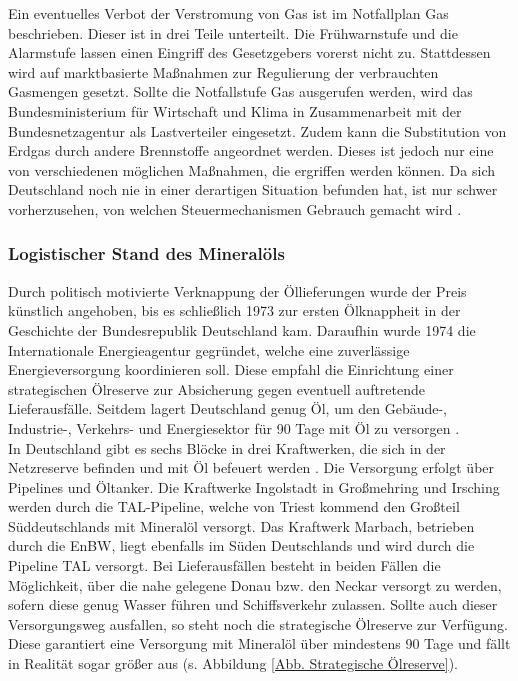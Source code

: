 			Ein eventuelles Verbot der Verstromung von Gas ist im Notfallplan Gas beschrieben.
			Dieser ist in drei Teile unterteilt. 
			Die Frühwarnstufe und die Alarmstufe lassen einen Eingriff des Gesetzgebers vorerst nicht zu. 
			Stattdessen wird auf marktbasierte Maßnahmen zur Regulierung der verbrauchten Gasmengen gesetzt. 			
			Sollte die Notfallstufe Gas ausgerufen werden, wird das Bundesministerium für Wirtschaft und Klima in Zusammenarbeit mit der Bundesnetzagentur als Lastverteiler eingesetzt.
			Zudem kann die Substitution von Erdgas durch andere Brennstoffe angeordnet werden.
			Dieses ist jedoch nur eine von verschiedenen möglichen Maßnahmen, die ergriffen werden können. 
			Da sich Deutschland noch nie in einer derartigen Situation befunden hat, ist nur schwer vorherzusehen, von welchen Steuermechanismen Gebrauch gemacht wird \cite{Notfallplan_Gas}.
	
		\subsubsection{Logistischer Stand des Mineralöls}
		
			Durch politisch motivierte Verknappung der Öllieferungen wurde der Preis künstlich angehoben, bis es schließlich 1973 zur ersten Ölknappheit in der Geschichte der Bundesrepublik Deutschland kam.
			Daraufhin wurde 1974 die Internationale Energieagentur gegründet, welche eine zuverlässige Energieversorgung koordinieren soll. 
			Diese empfahl die Einrichtung einer strategischen Ölreserve zur Absicherung gegen eventuell auftretende Lieferausfälle. 
			Seitdem lagert Deutschland genug Öl, um den Gebäude-, Industrie-, Verkehrs- und Energiesektor für 90 Tage mit Öl zu versorgen \cite{strat_Ölreserve_Geschichte}. \\
			
			In Deutschland gibt es sechs Blöcke in drei Kraftwerken, die sich in der Netzreserve befinden und mit Öl befeuert werden \cite{Excel_Kraftwerksliste}. 
			Die Versorgung erfolgt über Pipelines und Öltanker.
			Die Kraftwerke Ingolstadt in Großmehring und Irsching werden durch die TAL-Pipeline, welche von Triest kommend den Großteil Süddeutschlands mit Mineralöl versorgt. 
			Das Kraftwerk Marbach, betrieben durch die EnBW, liegt ebenfalls im Süden Deutschlands und wird durch die Pipeline TAL versorgt. 
			Bei Lieferausfällen besteht in beiden Fällen die Möglichkeit, über die nahe gelegene Donau bzw. den Neckar versorgt zu werden, sofern diese genug Wasser führen und Schiffsverkehr zulassen. 
			Sollte auch dieser Versorgungsweg ausfallen, so steht noch die strategische Ölreserve zur Verfügung. 
			Diese garantiert eine Versorgung mit Mineralöl über mindestens 90 Tage und fällt in Realität sogar größer aus (s. Abbildung \ref{Abb. Strategische Ölreserve}).
	
